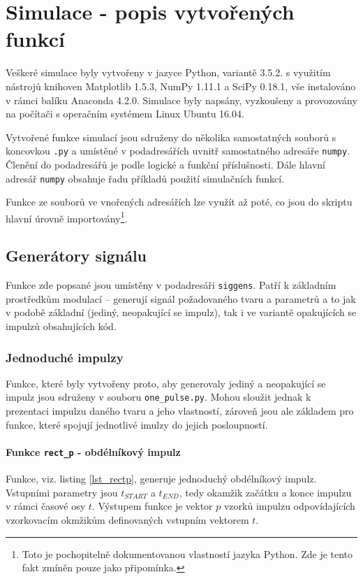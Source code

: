 \section{Simulace - popis vytvořených funkcí}

Veškeré simulace byly vytvořeny v jazyce Python, variantě 3.5.2. s využitím nástrojů knihoven Matplotlib 1.5.3, NumPy 1.11.1 a SciPy 0.18.1, vše instalováno v rámci balíku Anaconda 4.2.0. Simulace byly napsány, vyzkoušeny a provozovány na počítači s operačním systémem Linux Ubuntu 16.04.

Vytvořené funkce simulací jsou sdruženy do několika samostatných souborů s koncovkou \texttt{.py} a umístěné v podadresářích uvnitř samostatného adresáře \texttt{numpy}. Členění do podadresářů je podle logické a funkční příslušnosti. Dále hlavní adresář \texttt{numpy} obsahuje řadu příkladů použití simulačních funkcí.

Funkce ze souborů ve vnořených adresářích lze využít až poté, co jsou do skriptu hlavní úrovně importovány\footnote{Toto je pochopitelně dokumentovanou vlastností jazyka Python. Zde je tento fakt zmíněn pouze jako připomínka.}. 

\subsection{Generátory signálu}

Funkce zde popsané jsou umístěny v podadresáři \texttt{siggens}. Patří k základním prostředkům modulací -- generují signál požadovaného tvaru a parametrů a to jak v podobě základní (jediný, neopakující se impulz), tak i ve variantě opakujících se impulzů obsahujících kód. 

\subsubsection{Jednoduché impulzy}
Funkce, které byly vytvořeny proto, aby generovaly jediný a neopakující se impulz jsou sdruženy v souboru \texttt{one\_pulse.py}. Mohou sloužit jednak k prezentaci impulzu daného tvaru a jeho vlastností, zároveň jsou ale základem pro funkce, které spojují jednotlivé imulzy do jejich posloupností.

\paragraph{Funkce \texttt{rect\_p} - obdélníkový impulz}
Funkce, viz. listing \ref{lst_rectp}, generuje jednoduchý obdélníkový impulz. Vstupními parametry jsou $t_{START}$ a $t_{END}$, tedy okamžik začátku a konce impulzu v rámci časové osy $t$. Výstupem funkce je vektor $p$ vzorků impulzu odpovídajících vzorkovacím okmžikům definovaných vstupním vektorem $t$.

